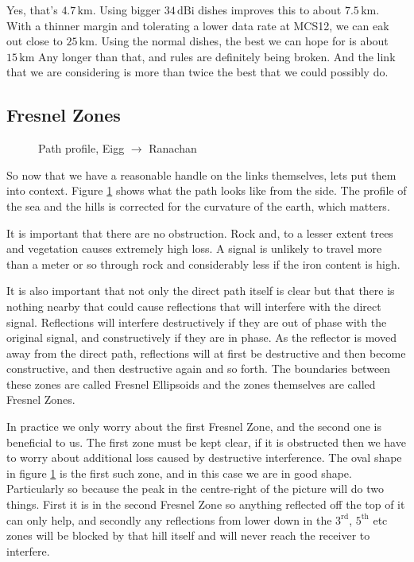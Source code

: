 Yes, that's $4.7\, \mathrm{km}$. Using bigger $34\, \mathrm{dBi}$
dishes improves this to about $7.5\, \mathrm{km}$. With a thinner
margin and tolerating a lower data rate at MCS12, we can eak out close
to $25\, \mathrm{km}$. Using the normal dishes, the best we can hope
for is about $15\, \mathrm{km}$ Any longer than that, and rules are
definitely being broken. And the link that we are considering is more
than twice the best that we could possibly do.

\subsection{Fresnel Zones}

\begin{figure}[h]
  \begin{center}
    
    \caption{Path profile, Eigg $\rightarrow$ Ranachan}
    \label{fig:EIG_RAN_profile}
  \end{center}
\end{figure}

So now that we have a reasonable handle on the links themselves, lets
put them into context. Figure \ref{fig:EIG_RAN_profile} shows what the
path looks like from the side. The profile of the sea and the hills is
corrected for the curvature of the earth, which matters.

It is important that there are no obstruction. Rock and, to a lesser
extent trees and vegetation causes extremely high loss. A signal is
unlikely to travel more than a meter or so through rock and
considerably less if the iron content is high.

It is also important that not only the direct path itself is clear but
that there is nothing nearby that could cause reflections that will
interfere with the direct signal. Reflections will interfere
destructively if they are out of phase with the original signal, and
constructively if they are in phase. As the reflector is moved away
from the direct path, reflections will at first be destructive and
then become constructive, and then destructive again and so forth. The
boundaries between these zones are called Fresnel Ellipsoids and the
zones themselves are called Fresnel Zones.

In practice we only worry about the first Fresnel Zone, and the second
one is beneficial to us. The first zone must be kept clear, if it is
obstructed then we have to worry about additional loss caused by
destructive interference. The oval shape in figure
\ref{fig:EIG_RAN_profile} is the first such zone, and in this case we
are in good shape. Particularly so because the peak in the
centre-right of the picture will do two things. First it is in the
second Fresnel Zone so anything reflected off the top of it can only
help, and secondly any reflections from lower down in the
$3^\mathrm{rd}$, $5^\mathrm{th}$ etc zones will be blocked by that
hill itself and will never reach the receiver to interfere.

